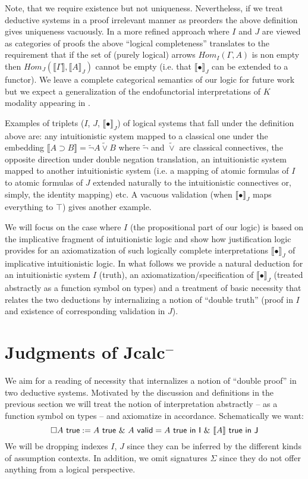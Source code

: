 Note, that we require existence but not uniqueness. Nevertheless, if we treat deductive systems  in a proof irrelevant manner as preorders 
the above definition gives uniqueness vacuously. In a more refined approach where $I$ and $J$ are viewed as  categories of proofs  the above ``logical completeness''  
translates to the requirement that if the set of (purely logical) arrows $Hom_I(\Gamma,A)$ is non empty  then $Hom_J(\llbracket\Gamma\rrbracket,\llbracket A\rrbracket_J)$ 
cannot be empty (i.e. that $\llbracket\bullet \rrbracket_J$ can be extended to a functor). We leave a complete categorical semantics of our logic 
for future work but we expect   a generalization of the 
endofunctorial interpretations of $K$ modality appearing in \cite{Bellin2001,kavvos2016system}. 


Examples of triplets ($I$, $J$, $\llbracket\bullet \rrbracket_J$) of logical systems that fall under the definition above are: any intuitionistic system mapped 
to a classical one under the embedding $\llbracket A \supset B\rrbracket= \tilde{\neg} A \tilde{\vee} B$ where  $\tilde{\neg}$
and $\tilde{\vee}$ are classical connectives, the opposite direction under double negation translation, 
an  intuitionistic system  mapped to another intuitionistic system (i.e. a mapping of atomic formulas of $I$ to atomic formulas of $J$ extended naturally to the intuitionistic connectives 
or, simply, the identity mapping) etc.  A vacuous validation  (when $\llbracket\bullet  \rrbracket_J$ maps everything to $\top$) gives another example. 

We will focus on the case where $I$ (the propositional part of our logic) is based on the implicative fragment of intuitionistic logic and show how justification logic
provides for an axiomatization of such logically complete interpretations $\llbracket\bullet\rrbracket_J$ of  implicative intuitionistic logic.
In what follows we provide  a natural deduction for
an intuitionistic system $I$ (truth), an axiomatization/specification of   $\llbracket \bullet \rrbracket_J$ (treated abstractly as a function symbol on types) and a treatment 
of basic necessity that relates the two deductions by internalizing  a  notion of ``double truth'' (proof in $I$  and  existence of corresponding validation in  $J$).
\section{Judgments of Jcalc$^{-}$}
\label{lsjcalc}

We aim for a reading of necessity that internalizes a notion of ``double proof''  in two deductive systems.
Motivated by the discussion and definitions in the previous section we will treat the notion of interpretation abstractly -- as a function symbol on types -- 
and axiomatize in accordance. Schematically we want:
$$\Box  A\  {\sf true} :=  A\ {\sf true}\   \& \ A\ {\sf valid} = A{\sf\  true\  in\  I}\  \& \  \llbracket  A \rrbracket \ {\sf true\  in\  J}$$
We will be dropping indexes $I$, $J$ since they can be inferred by the different kinds of assumption  contexts. In addition, we  omit signatures 
$\Sigma$ since they do not offer anything from a logical perspective.

